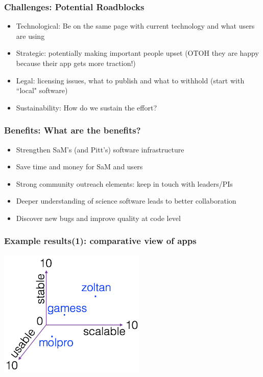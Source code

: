 \documentclass[hyperref={pdfpagelabels=false},12pt]{beamer}
\begin{document}
\begin{frame}
\frametitle{Challenges: Potential Roadblocks}
\begin{itemize}
\itemsep1em
\item
Technological: Be on the same page with current technology and what users are using
\item 
Strategic: potentially making important people upset (OTOH they are happy because their app gets more traction!)
\item
Legal: licensing issues, what to publish and what to withhold (start with ``local" software)
\item
 Sustainability: How do we sustain the effort?
\end{itemize}
\end{frame}

\begin{frame}
\frametitle{Benefits: What are the benefits?}
\begin{itemize}
\itemsep1em
\item Strengthen SaM's (and Pitt's) software infrastructure
\item
Save time and money for SaM and users
\item
Strong community outreach elements: keep in touch with leaders/PIs 
\item
Deeper understanding of science software leads to better collaboration
\item
Discover new bugs and improve quality at code level
\end{itemize}
\end{frame}

\begin{frame}
\frametitle{Example results(1): comparative view of apps}
\includegraphics[width=7cm]{plot_view}
\end{frame}
\end{document}
